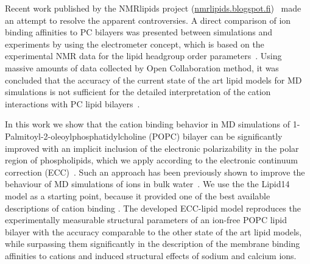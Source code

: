 \documentclass[aip,jcp,twocolumn]{revtex4}
\begin{document}
Recent work published by the NMRlipids project (\url{nmrlipids.blogspot.fi})~\cite{catte16}
made an attempt to resolve the apparent controversies. A direct comparison of
ion binding affinities to PC bilayers was presented between simulations and
experiments by using the electrometer concept, which is based on the experimental NMR data
for the lipid headgroup order parameters~\cite{seelig87}.
Using massive amounts of data collected by Open Collaboration method, it was concluded
that the accuracy of the current state of the art lipid models for MD
simulations is not sufficient for the detailed interpretation of the cation
interactions with PC lipid bilayers~\cite{catte16}.




In this work we show that the cation binding behavior
in MD simulations of 1-Palmitoyl-2-oleoylphosphatidylcholine (POPC) bilayer can be significantly 
improved with an implicit inclusion of the electronic polarizability
in the polar region of phospholipids,
which we apply according to the 
electronic continuum correction (ECC)~\cite{leontyev11}.
Such an approach has been previously shown to improve the behaviour of
MD simulations of ions in bulk water~\cite{jungwirth17-new-paper-to-be-published,Pluharova2014,kohagen14,kohagen16}. 
We use the the Lipid14 model \cite{dickson14} as a starting point,
because it provided one of the best available descriptions of cation binding \cite{catte16}.
The developed ECC-lipid model reproduces the experimentally
measurable structural parameters of an ion-free POPC lipid bilayer with the 
accuracy comparable to the other state of the art lipid models, while surpassing
them significantly in the description of the membrane binding affinities to cations and induced
structural effects of sodium and calcium ions.


\end{document}
